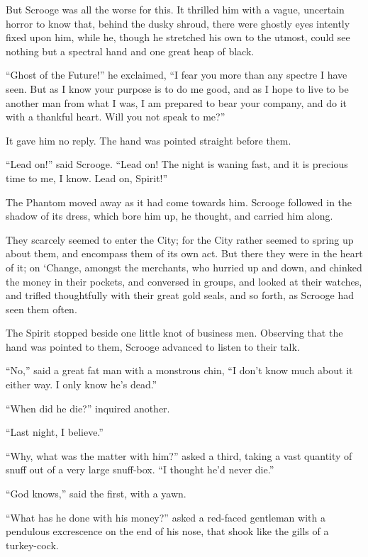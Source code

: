 \documentclass[paper=5.5in:8.5in,BCOR=7mm,twoside,DIV=calc,12pt,usegeometry]{scrbook} %
\begin{document}
But Scrooge was all the worse for this. It thrilled him with a vague, uncertain horror to know that, behind the dusky shroud, there were ghostly eyes intently fixed upon him, while he, though he stretched his own to the utmost, could see nothing but a spectral hand and one great heap of black.

\enquote{Ghost of the Future!} he exclaimed, \enquote{I fear you more than any spectre I have seen. But as I know your purpose is to do me good, and as I hope to live to be another man from what I was, I am prepared to bear your company, and do it with a thankful heart. Will you not speak to me?}

It gave him no reply. The hand was pointed straight before them.

\enquote{Lead on!} said Scrooge. \enquote{Lead on! The night is waning fast, and it is precious time to me, I know. Lead on, Spirit!}

The Phantom moved away as it had come towards him. Scrooge followed in the shadow of its dress, which bore him up, he thought, and carried him along.

They scarcely seemed to enter the City; for the City rather seemed to spring up about them, and encompass them of its own act. But there they were in the heart of it; on `Change, amongst the merchants, who hurried up and down, and chinked the money in their pockets, and conversed in groups, and looked at their watches, and trifled thoughtfully with their great gold seals, and so forth, as Scrooge had seen them often.

The Spirit stopped beside one little knot of business men. Observing that the hand was pointed to them, Scrooge advanced to listen to their talk.

\enquote{No,} said a great fat man with a monstrous chin, \enquote{I don't know much about it either way. I only know he's dead.}

\enquote{When did he die?} inquired another.

\enquote{Last night, I believe.}

\enquote{Why, what was the matter with him?} asked a third, taking a vast quantity of snuff out of a very large snuff-box. \enquote{I thought he'd never die.}

\enquote{God knows,} said the first, with a yawn.

\enquote{What has he done with his money?} asked a red-faced gentleman with a pendulous excrescence on the end of his nose, that shook like the gills of a turkey-cock.
\end{document}
